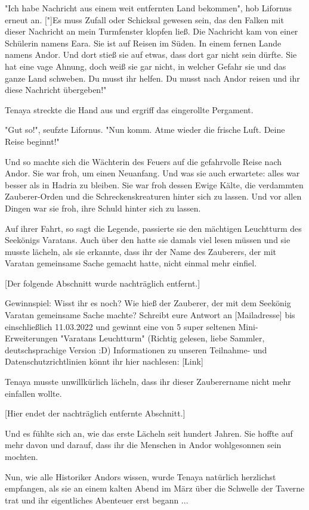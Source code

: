 \documentclass[10pt, a4paper, oneside]{book}
\begin{document}
\begin{multicols}{2}
"Ich habe Nachricht aus einem weit entfernten Land bekommen", hob Lifornus erneut an. ["]Es muss Zufall oder Schicksal gewesen sein, das den Falken mit dieser Nachricht an mein Turmfenster klopfen ließ. Die Nachricht kam von einer Schülerin namens Eara. Sie ist auf Reisen im Süden. In einem fernen Lande namens Andor. Und dort stieß sie auf etwas, dass dort gar nicht sein dürfte. Sie hat eine vage Ahnung, doch weiß sie gar nicht, in welcher Gefahr sie und das ganze Land schweben. Du musst ihr helfen. Du musst nach Andor reisen und ihr diese Nachricht übergeben!"

Tenaya streckte die Hand aus und ergriff das eingerollte Pergament.

"Gut so!", seufzte Lifornus. "Nun komm. Atme wieder die frische Luft. Deine Reise beginnt!"

Und so machte sich die Wächterin des Feuers auf die gefahrvolle Reise nach Andor. Sie war froh, um einen Neuanfang. Und was sie auch erwartete: alles war besser als in Hadria zu bleiben. Sie war froh dessen Ewige Kälte, die verdammten Zauberer-Orden und die Schreckenskreaturen hinter sich zu lassen. Und vor allen Dingen war sie froh, ihre Schuld hinter sich zu lassen.

Auf ihrer Fahrt, so sagt die Legende, passierte sie den mächtigen Leuchtturm des Seekönigs Varatans. Auch über den hatte sie damals viel lesen müssen und sie musste lächeln, als sie erkannte, dass ihr der Name des Zauberers, der mit Varatan gemeinsame Sache gemacht hatte, nicht einmal mehr einfiel. 

[Der folgende Abschnitt wurde nachträglich entfernt.]

Gewinnspiel: Wisst ihr es noch? Wie hieß der Zauberer, der mit dem Seekönig Varatan gemeinsame Sache machte? Schreibt eure Antwort an [Mailadresse] bis einschließlich 11.03.2022 und gewinnt eine von 5 super seltenen Mini-Erweiterungen "Varatans Leuchtturm" (Richtig gelesen, liebe Sammler, deutschsprachige Version :D)
Informationen zu unseren Teilnahme- und Datenschutzrichtlinien könnt ihr hier nachlesen:
[Link]
 
 
Tenaya musste unwillkürlich lächeln, dass ihr dieser Zauberername nicht mehr einfallen wollte. 

[Hier endet der nachträglich entfernte Abschnitt.]

Und es fühlte sich an, wie das erste Lächeln seit hundert Jahren. Sie hoffte auf mehr davon und darauf, dass ihr die Menschen in Andor wohlgesonnen sein mochten.

Nun, wie alle Historiker Andors wissen, wurde Tenaya natürlich herzlichst empfangen, als sie an einem kalten Abend im März über die Schwelle der Taverne trat und ihr eigentliches Abenteuer erst begann ...


\end{multicols}
\end{document}

